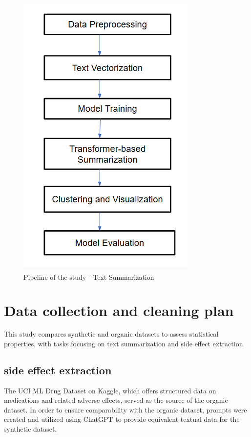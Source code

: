\documentclass[sigplan,screen]{acmart}
\begin{document}
\begin{figure}[htbp]
    \centering
    \includegraphics[height=0.5\textheight]{Methodology - Text Summarization.png}  %
    \caption{Pipeline of the study - Text Summarization}
    \label{fig:your_label}
\end{figure}








\section{Data collection and cleaning plan}

This study compares synthetic and organic datasets to assess statistical properties, with tasks focusing on text summarization and side effect extraction.
\subsection{side effect extraction}
The UCI ML Drug Dataset on Kaggle, which offers structured data on medications and related adverse effects, served as the source of the organic dataset. In order to ensure comparability with the organic dataset, prompts were created and utilized using ChatGPT to provide equivalent textual data for the synthetic dataset.
\end{document}
